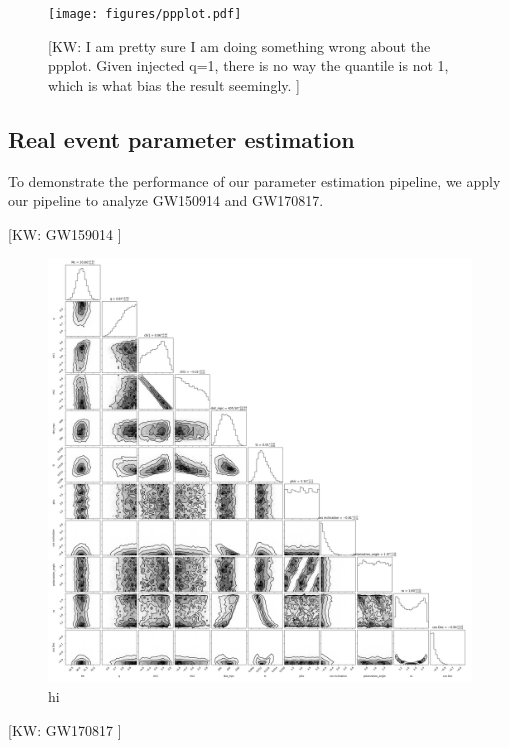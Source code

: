 \documentclass[twocolumn]{aastex631}
\newcommand{\kw}[1]{{\color{rb4}[KW: #1 ]}}
\begin{document}
\begin{figure}
    \texttt{[image: figures/ppplot.pdf]}
    \caption{ \kw{I am pretty sure I am doing something wrong about the ppplot.
        Given injected q=1, there is no way the quantile is not 1, which is what
        bias the result seemingly.} }
    \label{fig:ppplot}
    \end{figure}

\subsection{Real event parameter estimation}

To demonstrate the performance of our parameter estimation pipeline, we apply
our pipeline to analyze GW150914 and GW170817. 

\kw{GW159014}

\begin{figure}
\includegraphics[width=0.99\linewidth]{static/GW150914.png}
\caption{
    hi
}
\label{fig:GW150914}
\end{figure}

\kw{GW170817}
\end{document}

